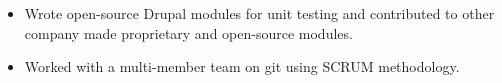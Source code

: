 \documentclass[]{friggeri-cv} %
\begin{document}
\begin{entrylist}
{\begin{itemize}
\item Wrote open-source Drupal modules for unit testing and contributed to other company made proprietary and open-source modules.
\item Worked with a multi-member team on git using SCRUM methodology.
\end{itemize}}
 \end{entrylist}
 
\end{document}
